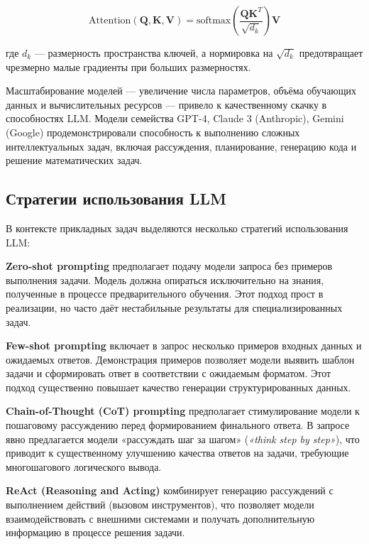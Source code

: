\begin{equation}
    \text{Attention}(\mathbf{Q}, \mathbf{K}, \mathbf{V}) = \text{softmax}\left(\frac{\mathbf{Q}\mathbf{K}^T}{\sqrt{d_k}}\right)\mathbf{V}
\end{equation}

где $d_k$ --- размерность пространства ключей, а нормировка на $\sqrt{d_k}$ предотвращает чрезмерно малые градиенты при больших размерностях.

Масштабирование моделей --- увеличение числа параметров, объёма обучающих данных и вычислительных ресурсов --- привело к качественному скачку в способностях LLM. Модели семейства GPT-4, Claude 3 (Anthropic), Gemini (Google) продемонстрировали способность к выполнению сложных интеллектуальных задач, включая рассуждения, планирование, генерацию кода и решение математических задач.

\subsection{Стратегии использования LLM}

В контексте прикладных задач выделяются несколько стратегий использования LLM:

\textbf{Zero-shot prompting} предполагает подачу модели запроса без примеров выполнения задачи. Модель должна опираться исключительно на знания, полученные в процессе предварительного обучения. Этот подход прост в реализации, но часто даёт нестабильные результаты для специализированных задач.

\textbf{Few-shot prompting} \cite{brown2020gpt3} включает в запрос несколько примеров входных данных и ожидаемых ответов. Демонстрация примеров позволяет модели выявить шаблон задачи и сформировать ответ в соответствии с ожидаемым форматом. Этот подход существенно повышает качество генерации структурированных данных.

\textbf{Chain-of-Thought (CoT) prompting} \cite{wei2022chain} предполагает стимулирование модели к пошаговому рассуждению перед формированием финального ответа. В запросе явно предлагается модели «рассуждать шаг за шагом» (\textit{«think step by step»}), что приводит к существенному улучшению качества ответов на задачи, требующие многошагового логического вывода.

\textbf{ReAct (Reasoning and Acting)} \cite{yao2023react} комбинирует генерацию рассуждений с выполнением действий (вызовом инструментов), что позволяет модели взаимодействовать с внешними системами и получать дополнительную информацию в процессе решения задачи.

